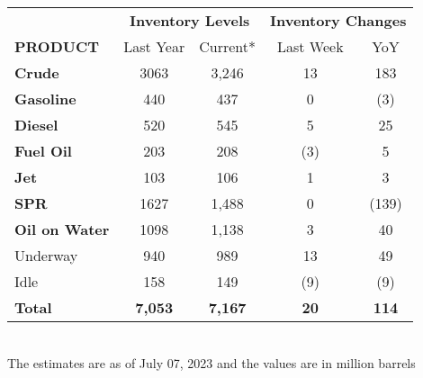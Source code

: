 \documentclass[12pt, a4paper]{article}
\begin{document}
\begin{itemize}
\begin{table}[h]
\begin{tabular}{lcc|cc}
\hline
& \multicolumn{2}{c}{\textbf{Inventory Levels}}                & \multicolumn{2}{c}{\textbf{Inventory Changes}}               \\
\textbf{PRODUCT}                                   & \multicolumn{1}{c}{Last Year} & \multicolumn{1}{c}{Current*} & \multicolumn{1}{c}{Last Week} & \multicolumn{1}{c}{YoY}      \\
\hline
\textbf{Crude}                                     & 3063                          & 3,246                        & 13                            & 183                          \\
\textbf{Gasoline}                                  & 440                           & 437                          & 0                             & {\color[HTML]{FF0000} (3)}   \\
\textbf{Diesel}                                    & 520                           & 545                          & 5                             & 25                           \\
\textbf{Fuel Oil}                                  & 203                           & 208                          & {\color[HTML]{FF0000} (3)}    & 5                            \\
\textbf{Jet}                                       & 103                           & 106                          & 1                             & 3                            \\
\textbf{SPR}                                       & 1627                          & 1,488                        & 0                             & {\color[HTML]{FF0000} (139)} \\
\textbf{Oil on Water}                              & 1098                          & 1,138                        & 3                             & 40                           \\
Underway                                           & 940                           & 989                          & 13                            & 49                           \\
Idle                                               & 158                           & 149                          & {\color[HTML]{FF0000} (9)}    & {\color[HTML]{FF0000} (9)}   \\
\hline
\textbf{Total}                                     & \textbf{7,053}                & \textbf{7,167}               & \textbf{20}                   & \textbf{114}\\                
\hline
\end{tabular}\\
\vspace{0.4em}
The estimates are as of July 07, 2023 and the values are in million barrels


\end{table}
\end{itemize}
\end{document}

